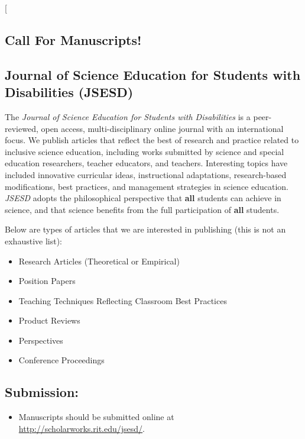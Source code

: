 \documentclass[11pt]{sig-alternate}
\begin{document}
\begin{large}
\twocolumn[
\begin{@twocolumnfalse}

\section*{Call For Manuscripts!}

\subsection*{Journal of Science Education for Students with Disabilities (JSESD)}

The \textit{Journal of Science Education for Students with Disabilities} is a peer-reviewed, open access, multi-disciplinary online journal with an international focus. We publish articles that reflect the best of research and practice related to inclusive science education, including works submitted by science and special education researchers, teacher educators, and teachers. Interesting topics have included innovative curricular ideas, instructional adaptations, research-based modifications, best practices, and management strategies in science education. \textit{JSESD} adopts the philosophical perspective that \textbf{all} students can achieve in science, and that science benefits from the full participation of \textbf{all} students.

Below are types of articles that we are interested in publishing (this is not an exhaustive list):
\begin{itemize}
    \item Research Articles (Theoretical or Empirical)
    \item Position Papers
    \item Teaching Techniques Reflecting Classroom Best Practices
    \item Product Reviews
    \item Perspectives
    \item Conference Proceedings
\end{itemize}

\subsection*{Submission:}
\begin{itemize}
    \item Manuscripts should be submitted online at \url{http://scholarworks.rit.edu/jsesd/}.
\end{itemize}


\end{@twocolumnfalse}
\end{large}
\end{document}

